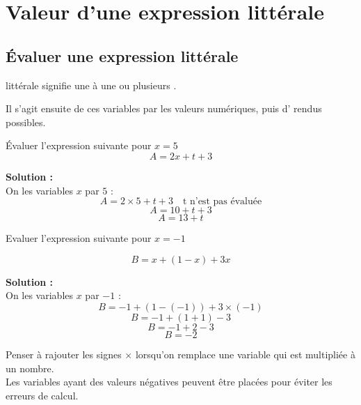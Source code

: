 \section{Valeur d’une expression littérale}

\subsection{\'Evaluer une expression littérale}

\begin{Definition}
     littérale signifie  une  à une ou plusieurs .

    Il s'agit ensuite de  ces variables par les valeurs numériques, puis d' rendus possibles.\\
\end{Definition}

\begin{Methode}
    \begin{minipage}[t]{0.475\textwidth}
        \'Evaluer l'expression suivante pour $x = 5$
        \[A = 2x + t + 3\]

        \textbf{Solution :}\\
        On  les variables $x$ par $5$ :\\
        \[A = 2\times 5 + t + 3 \quad \text{t n'est pas évaluée}\]
        \[A = 10 + t + 3\]
        \[A = 13 + t\]
    \end{minipage}
    \hfill
    \begin{minipage}[t]{0.475\textwidth}
        Evaluer l'expression suivante pour $x = -1$

        \[B = x + (1 - x) + 3x\]

        \textbf{Solution :}\\
        On  les variables $x$ par $-1$ :\\
        \[B = -1 + (1 - (-1)) + 3\times ( -1 )\]
        \[B = -1 + (1 + 1) - 3\]
        \[B = -1 + 2 - 3\]
        \[B = -2\]
    \end{minipage}
\end{Methode}

\begin{Remarque}
    \bcattention Penser à rajouter les signes $\times$ lorsqu'on remplace une variable qui est multipliée à un nombre.\\
    \bcattention Les variables ayant des valeurs négatives peuvent être placées  pour éviter les erreurs de calcul.
\end{Remarque}


